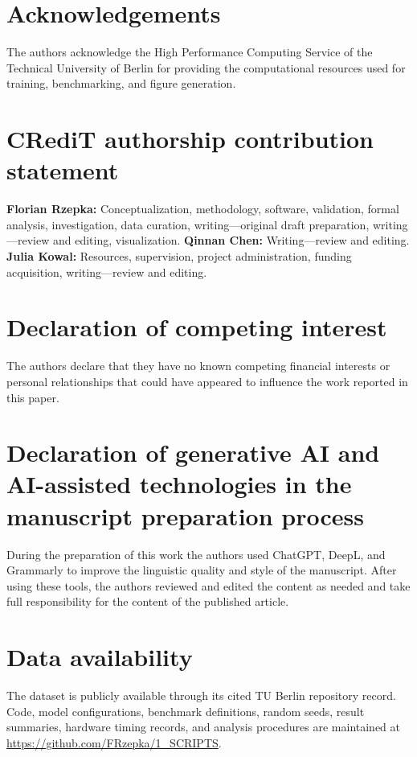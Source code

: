 \documentclass[11pt,a4paper]{article}
\begin{document}
\section*{Acknowledgements}
The authors acknowledge the High Performance Computing Service of the Technical University of Berlin for providing the computational resources used for training, benchmarking, and figure generation.

\section*{CRediT authorship contribution statement}
\textbf{Florian Rzepka:} Conceptualization, methodology, software, validation, formal analysis, investigation, data curation, writing---original draft preparation, writing---review and editing, visualization. \textbf{Qinnan Chen:} Writing---review and editing. \textbf{Julia Kowal:} Resources, supervision, project administration, funding acquisition, writing---review and editing.

\section*{Declaration of competing interest}
The authors declare that they have no known competing financial interests or personal relationships that could have appeared to influence the work reported in this paper.

\section*{Declaration of generative AI and AI-assisted technologies in the manuscript preparation process}
During the preparation of this work the authors used ChatGPT, DeepL, and Grammarly to improve the linguistic quality and style of the manuscript. After using these tools, the authors reviewed and edited the content as needed and take full responsibility for the content of the published article.

\section*{Data availability}
The dataset is publicly available through its cited TU Berlin repository record. Code, model configurations, benchmark definitions, random seeds, result summaries, hardware timing records, and analysis procedures are maintained at \url{https://github.com/FRzepka/1_SCRIPTS}.
\end{document}
